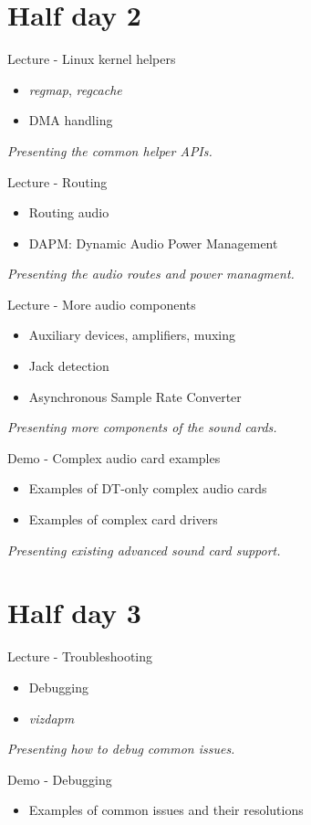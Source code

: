 \documentclass[a4paper,12pt,obeyspaces,spaces,hyphens]{article}
\begin{document}
\section{Half day 2}

\feagendatwocolumn
{Lecture - Linux kernel helpers}
{
  \begin{itemize}
  \item {\em regmap}, {\em regcache}
  \item DMA handling
  \end{itemize}
  \vspace{0.5em}
  {\em Presenting the common helper APIs.}
}
{Lecture - Routing}
{
  \begin{itemize}
  \item Routing audio
  \item DAPM: Dynamic Audio Power Management
  \end{itemize}
  \vspace{0.5em}
  {\em Presenting the audio routes and power managment.}
}

\feagendatwocolumn
{Lecture - More audio components}
{
  \begin{itemize}
  \item Auxiliary devices, amplifiers, muxing
  \item Jack detection
  \item Asynchronous Sample Rate Converter
  \end{itemize}
  \vspace{0.5em}
  {\em Presenting more components of the sound cards.}
}
{Demo - Complex audio card examples}
{
  \begin{itemize}
  \item Examples of DT-only complex audio cards
  \item Examples of complex card drivers
  \end{itemize}
  \vspace{0.5em}
  {\em Presenting existing advanced sound card support.}
}

\section{Half day 3}

\feagendatwocolumn
{Lecture - Troubleshooting}
{
  \begin{itemize}
  \item Debugging
  \item {\em vizdapm}
  \end{itemize}
  \vspace{0.5em}
  {\em Presenting how to debug common issues.}
}
{Demo - Debugging}
{
  \begin{itemize}
  \item Examples of common issues and their resolutions
  \end{itemize}
}
\end{document}
